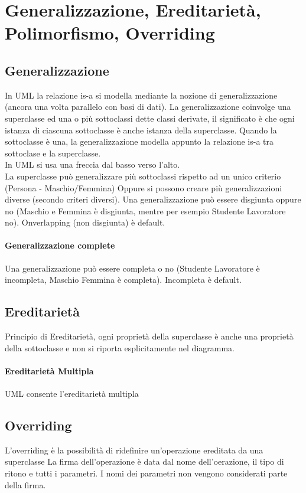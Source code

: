 \section{Generalizzazione, Ereditarietà, Polimorfismo, Overriding}
\subsection*{Generalizzazione}
In UML la relazione is-a si modella mediante la nozione di generalizzazione 
(ancora una volta parallelo con basi di dati). La generalizzazione coinvolge una superclasse
ed una o più sottoclassi dette classi derivate, il significato è che ogni
istanza di ciascuna sottoclasse è anche istanza della superclasse. Quando la sottoclasse
è una, la generalizzazione modella appunto la relazione is-a tra sottoclase e la superclasse.
\\ In UML si usa una freccia dal basso verso l'alto.
\\ La superclasse può generalizzare più sottoclassi rispetto ad un unico criterio (Persona - Maschio/Femmina)
Oppure si possono creare più generalizzazioni diverse (secondo criteri diversi).
Una generalizzazione può essere disgiunta oppure no (Maschio e Femmina è disgiunta, mentre
per esempio Studente Lavoratore no). Onverlapping (non disgiunta) è default.
\paragraph*{Generalizzazione complete} Una generalizzazione può essere completa o no (Studente
Lavoratore è incompleta, Maschio Femmina è completa). Incompleta è default.
\subsection*{Ereditarietà}
Principio di Ereditarietà, ogni proprietà della superclasse è anche una proprietà
della sottoclasse e non si riporta esplicitamente nel diagramma.
\paragraph*{Ereditarietà Multipla} UML consente l'ereditarietà multipla
\subsection*{Overriding}
L'overriding è la possibilità di ridefinire un'operazione ereditata da una superclasse
La firma dell'operazione è data dal nome dell'oerazione, il tipo di ritono e tutti i parametri.
I nomi dei parametri non vengono considerati parte della firma.
